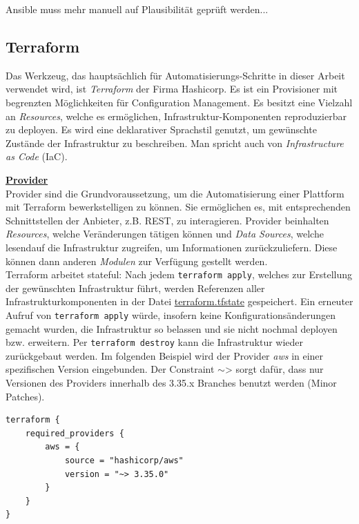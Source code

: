 Ansible muss mehr manuell auf Plausibilität geprüft werden...

\subsection{Terraform}
Das Werkzeug, das hauptsächlich für Automatisierungs-Schritte in dieser Arbeit verwendet wird, ist \textit{Terraform} der Firma Hashicorp. Es ist ein Provisioner mit begrenzten Möglichkeiten für Configuration Management. Es besitzt eine Vielzahl an \textit{Resources}, welche es ermöglichen, Infrastruktur-Komponenten  reproduzierbar  zu  deployen. Es wird eine deklarativer Sprachstil genutzt, um gewünschte Zustände der Infrastruktur zu beschreiben. Man spricht auch von \textit{Infrastructure as Code} (IaC).

\textbf{\underline{Provider}}\\
Provider sind die Grundvoraussetzung, um die Automatisierung einer Plattform mit Terraform bewerkstelligen zu können. Sie ermöglichen es, mit entsprechenden Schnittstellen der Anbieter, z.B. REST, zu interagieren. Provider beinhalten \textit{Resources}, welche Veränderungen tätigen können und \textit{Data Sources}, welche \glqq lesend\grqq auf die Infrastruktur zugreifen, um Informationen zurückzuliefern. Diese können dann anderen \textit{Modulen} zur Verfügung gestellt werden.\\
Terraform arbeitet stateful: Nach jedem \texttt{terraform apply}, welches zur Erstellung der gewünschten Infrastruktur führt, werden Referenzen aller Infrastrukturkomponenten in der Datei \underline{terraform.tfstate} gespeichert. Ein erneuter Aufruf von \texttt{terraform apply} würde, insofern keine Konfigurationsänderungen gemacht wurden, die Infrastruktur so belassen und sie nicht nochmal deployen bzw. erweitern. Per \texttt{terraform destroy} kann die Infrastruktur wieder zurückgebaut werden.
Im folgenden Beispiel wird der Provider \textit{aws} in einer spezifischen Version eingebunden. Der Constraint \glqq $\sim$>\grqq{} sorgt dafür, dass nur Versionen des Providers innerhalb des 3.35.x Branches benutzt werden (\glqq Minor Patches\grqq{}).

\begin{verbatim}
terraform {
    required_providers {
        aws = {
            source = "hashicorp/aws"
            version = "~> 3.35.0"
        }
    }
}
\end{verbatim}

